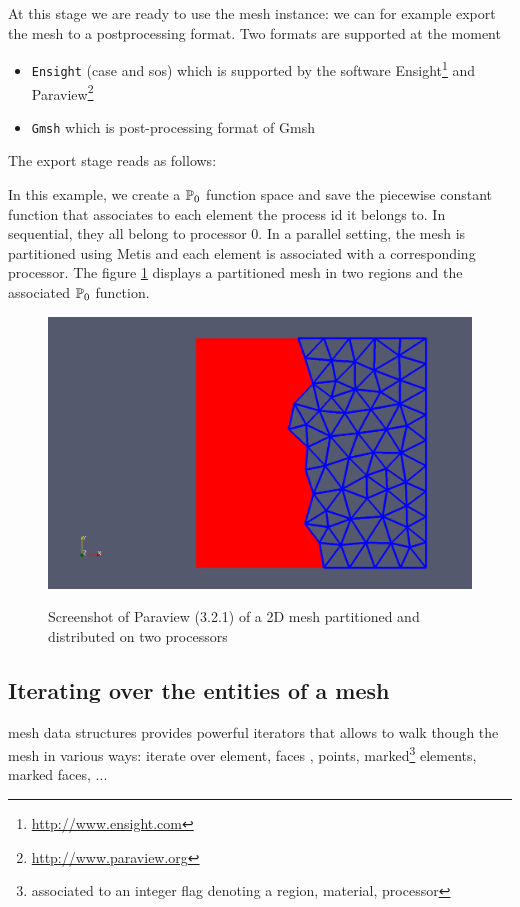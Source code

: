 


At this stage we are ready to use the mesh instance: we can for
example export the mesh to a postprocessing format. Two formats are
supported at the moment
\begin{itemize}
\item \lstinline!Ensight! (case and sos) which is supported by the
  software Ensight\footnote{\url{http://www.ensight.com}} and
  Paraview\footnote{\url{http://www.paraview.org}}
\item \lstinline!Gmsh! which is post-processing format of Gmsh
\end{itemize}

The export stage reads as follows:



In this example, we create a $\mathbb{P}_{0}$ function space and save the
piecewise constant function that associates to each element the
process id it belongs to. In sequential, they all belong to processor
0.  In a parallel setting, the mesh is partitioned using Metis and
each element is associated with a corresponding processor. The figure
\ref{fig:1} displays a partitioned mesh in two regions and the
associated $\mathbb{P}_{0}$ function.

\begin{figure}[htbp]
  \centering
  \includegraphics[width=.7\linewidth]{mymeshpartition}
  \label{fig:1}
  \caption{Screenshot of Paraview (3.2.1) of a 2D mesh partitioned and distributed on two processors}
\end{figure}


\subsection{Iterating over the entities of a mesh}

\feel mesh data structures provides powerful iterators that allows to
walk though the mesh in various ways: iterate over element, faces ,
points, marked\footnote{associated to an integer flag denoting a
  region, material, processor} elements, marked faces, ...



